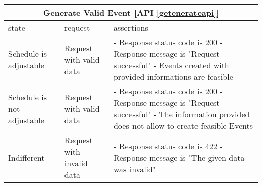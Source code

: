 \begin{center}
	\begin{tabular}{|p{}|p{}|p{}|}
		\hline
		\multicolumn{3}{c}{Generate Valid Event [API \ref{getenerateapi}]}\\
		
		\hline
		state & request & assertions \\
		
		
		\hline
		Schedule is adjustable &
		Request with valid data & 
		- Response status code is 200 \newline
		- Response message is "Request successful" \newline
		- Events created with provided informations are feasible
		\\
		
		\hline
		Schedule is not adjustable &
		Request with valid data & 
		- Response status code is 200 \newline
		- Response message is "Request successful" \newline
		- The information provided does not allow to create feasible Events
		\\
		
		\hline
		Indifferent &
		Request with invalid data & 
		- Response status code is 422 \newline
		- Response message is "The given data was invalid"\newline
		\\
		
		\hline
		
	\end{tabular}
\end{center}

